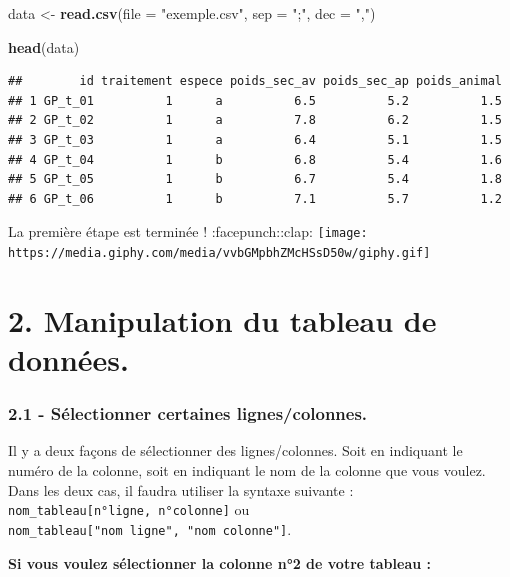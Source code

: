 \documentclass[
]{article}
\newenvironment{Shaded}{\begin{snugshade}}{\end{snugshade}}
\newcommand{\DataTypeTok}[1]{\textcolor[rgb]{0.13,0.29,0.53}{#1}}
\newcommand{\KeywordTok}[1]{\textcolor[rgb]{0.13,0.29,0.53}{\textbf{#1}}}
\newcommand{\NormalTok}[1]{#1}
\newcommand{\StringTok}[1]{\textcolor[rgb]{0.31,0.60,0.02}{#1}}
\begin{document}
\begin{Shaded}
\begin{Highlighting}[]
\NormalTok{data <-}\StringTok{ }\KeywordTok{read.csv}\NormalTok{(}\DataTypeTok{file =} \StringTok{"exemple.csv"}\NormalTok{,}
                 \DataTypeTok{sep =} \StringTok{";"}\NormalTok{,}
                 \DataTypeTok{dec =} \StringTok{","}\NormalTok{)}

\KeywordTok{head}\NormalTok{(data)}
\end{Highlighting}
\end{Shaded}

\begin{verbatim}
##        id traitement espece poids_sec_av poids_sec_ap poids_animal
## 1 GP_t_01          1      a          6.5          5.2          1.5
## 2 GP_t_02          1      a          7.8          6.2          1.5
## 3 GP_t_03          1      a          6.4          5.1          1.5
## 4 GP_t_04          1      b          6.8          5.4          1.6
## 5 GP_t_05          1      b          6.7          5.4          1.8
## 6 GP_t_06          1      b          7.1          5.7          1.2
\end{verbatim}

La première étape est terminée ! :facepunch::clap:
\texttt{[image: https://media.giphy.com/media/vvbGMpbhZMcHSsD50w/giphy.gif]}

\hypertarget{manipulation-du-tableau-de-donnuxe9es.}{%
\section{2. Manipulation du tableau de
données.}\label{manipulation-du-tableau-de-donnuxe9es.}}

\hypertarget{suxe9lectionner-certaines-lignescolonnes.}{%
\subsubsection{2.1 - Sélectionner certaines
lignes/colonnes.}\label{suxe9lectionner-certaines-lignescolonnes.}}

Il y a deux façons de sélectionner des lignes/colonnes. Soit en
indiquant le numéro de la colonne, soit en indiquant le nom de la
colonne que vous voulez. Dans les deux cas, il faudra utiliser la
syntaxe suivante : \texttt{nom\_tableau{[}n°ligne,\ n°colonne{]}} ou
\texttt{nom\_tableau{[}"nom\ ligne",\ "nom\ colonne"{]}}.

\textbf{Si vous voulez sélectionner la colonne n°2 de votre tableau : }
\end{document}
